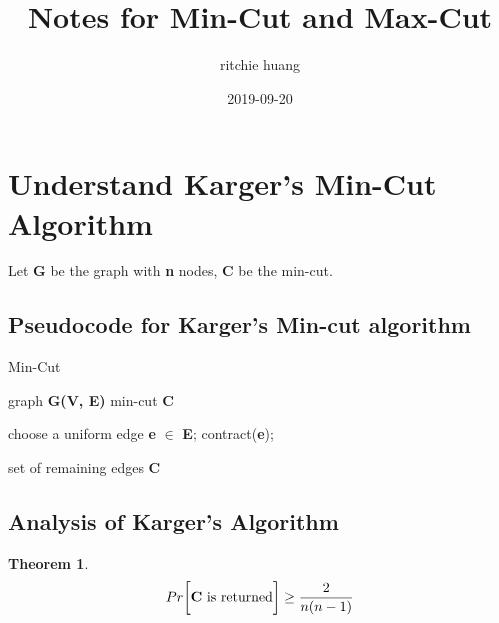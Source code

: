 \documentclass[a4paper, 12pt, titlepage]{article}
\title{Notes for Min-Cut and Max-Cut}
\author{ritchie huang}
\date{2019-09-20}
\newtheorem{theorem}{Theorem}
\begin{document}
\maketitle 

\tableofcontents
\newpage

\section{Understand Karger's Min-Cut Algorithm}
Let \textbf{G} be the graph with \textbf{n} nodes, \textbf{C} be the min-cut. 

\subsection{Pseudocode for Karger's Min-cut algorithm}
\begin{algorithm}[h]
    \caption{Min-Cut}
    \begin{algorithmic}[1]
        \Require graph {\bf G(V, E)}
        \Ensure min-cut {\bf C}

            \State choose a uniform edge {\bf e} $\in$ {\bf E};
            \State contract({\bf e});

        \EndWhile
        \State \Return set of remaining edges {\bf C}
    \end{algorithmic}
\end{algorithm}

\subsection{Analysis of Karger's Algorithm}
\begin{theorem}
\[
    Pr \bigg[ \text{\textbf{C} is returned} \bigg] \geq \frac{2}{n (n - 1)}
\]
\end{theorem}
\end{document}
